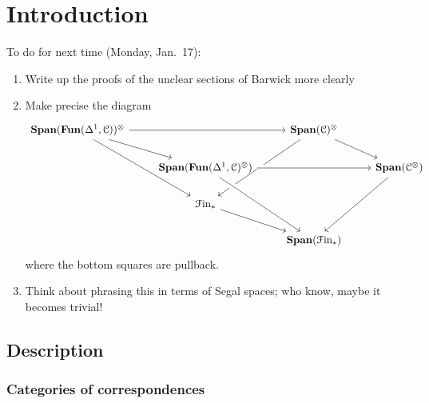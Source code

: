 \documentclass[main.tex]{subfiles}
\begin{document}
\chapter{Introduction}
\label{ch:introduction}

To do for next time (Monday, Jan.\ 17):
\begin{enumerate}
  \item Write up the proofs of the unclear sections of Barwick more clearly

  \item Make precise the diagram
    \begin{equation*}
      \begin{tikzcd}
        \Span(\Fun(\Delta^{1}, \category{C}))^{\otimes}
        \arrow[rr]
        \arrow[ddr]
        \arrow[dr]
        && \Span(\category{C})^{\otimes}
        \arrow[ddl]
        \arrow[dr]
        \\
        & \Span(\Fun(\Delta^{1}, \category{C})^{\otimes})
        \arrow[ddr, crossing over]
        \arrow[rr, crossing over]
        && \Span(\category{C}^{\otimes})
        \arrow[ddl]
        \\
        & \Finp
        \arrow[dr]
        \\
        && \Span(\Finp)
      \end{tikzcd}
    \end{equation*}
    where the bottom squares are pullback.

  \item Think about phrasing this in terms of Segal spaces; who know, maybe it becomes trivial!
\end{enumerate}

\section{Description}
\label{sec:description}

\subsection{Categories of correspondences}
\label{ssc:categories_of_correspondences}
\end{document}
